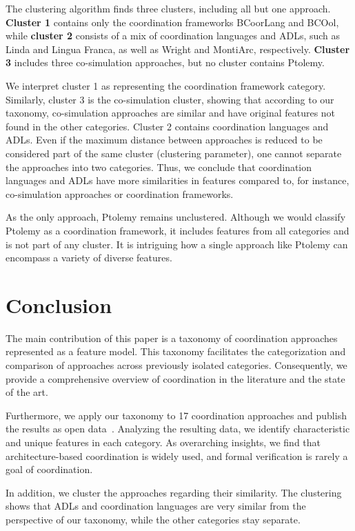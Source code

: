 \documentclass[runningheads]{llncs}
\begin{document}
The clustering algorithm finds three clusters, including all but one approach.
\textbf{Cluster 1} contains only the coordination frameworks BCoorLang and BCOol, 
while \textbf{cluster 2} consists of a mix of coordination languages and ADLs, such as Linda and Lingua Franca, as well as Wright and MontiArc, respectively.
\textbf{Cluster 3} includes three co-simulation approaches, but no cluster contains Ptolemy.

We interpret cluster 1 as representing the coordination framework category.
Similarly, cluster 3 is the co-simulation cluster, showing that according to our taxonomy, co-simulation approaches are similar and have original features not found in the other categories.
Cluster 2 contains coordination languages and ADLs.
Even if the maximum distance between approaches is reduced to be considered part of the same cluster (clustering parameter), one cannot separate the approaches into two categories.
Thus, we conclude that coordination languages and ADLs have more similarities in features compared to, for instance, co-simulation approaches or coordination frameworks.

As the only approach, Ptolemy remains unclustered. 
Although we would classify Ptolemy as a coordination framework, it includes features from all categories and is not part of any cluster.
It is intriguing how a single approach like Ptolemy can encompass a variety of diverse features.

\section{Conclusion} \label{sec: conclusion}

The main contribution of this paper is a taxonomy of coordination approaches represented as a feature model.
This taxonomy facilitates the categorization and comparison of approaches across previously isolated categories.
Consequently, we provide a comprehensive overview of coordination in the literature and the state of the art.

Furthermore, we apply our taxonomy to 17 coordination approaches and publish the results as open data~\cite{timkrauterArtifactsCoordination2024}.
Analyzing the resulting data, we identify characteristic and unique features in each category.
As overarching insights, we find that architecture-based coordination is widely used, and formal verification is rarely a goal of coordination. 

In addition, we cluster the approaches regarding their similarity.
The clustering shows that ADLs and coordination languages are very similar from the perspective of our taxonomy, while the other categories stay separate.



\end{document}
